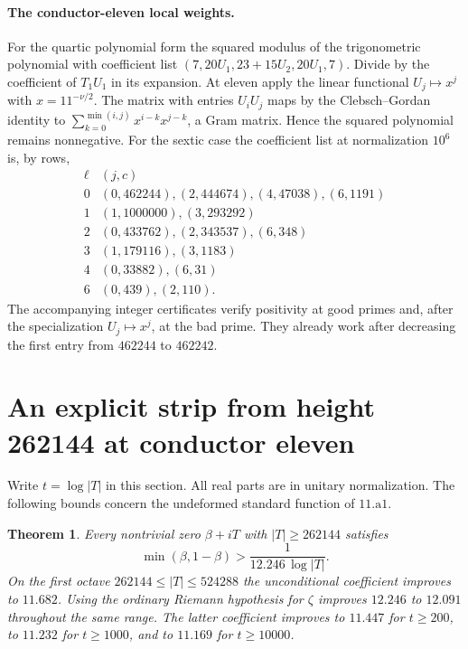 \documentclass[11pt]{article}
\newtheorem{theorem}{Theorem}[section]\newtheorem{lemma}[theorem]{Lemma}\newtheorem{corollary}[theorem]{Corollary}
\begin{document}
\paragraph{The conductor-eleven local weights.}
For the quartic polynomial form the squared modulus of the trigonometric polynomial with coefficient list $(7,20U_1,23+15U_2,20U_1,7)$. Divide by the coefficient of $T_1 U_1$ in its expansion. At eleven apply the linear functional $U_j\mapsto x^j$ with $x=11^{-\nu/2}$. The matrix with entries $U_i U_j$ maps by the Clebsch--Gordan identity to $\sum_{k=0}^{\min(i,j)} x^{i-k}x^{j-k}$, a Gram matrix. Hence the squared polynomial remains nonnegative. For the sextic case the coefficient list at normalization $10^6$ is, by rows,
\[
\begin{array}{c|l}
\ell&(j,c)\\ \hline
0&(0,462244),(2,444674),(4,47038),(6,1191)\\
1&(1,1000000),(3,293292)\\
2&(0,433762),(2,343537),(6,348)\\
3&(1,179116),(3,1183)\\
4&(0,33882),(6,31)\\
6&(0,439),(2,110).
\end{array}
\]
The accompanying integer certificates verify positivity at good primes and, after the specialization $U_j\mapsto x^j$, at the bad prime. They already work after decreasing the first entry from $462244$ to $462242$.


\section{An explicit strip from height 262144 at conductor eleven}
\label{section:level11-effective}
Write $t=\log|T|$ in this section. All real parts are in unitary normalization. The following bounds concern the undeformed standard function of $11.\mathrm{a1}$.

\begin{theorem}
Every nontrivial zero $\beta+iT$ with $|T|\ge262144$ satisfies
\[
       \min(\beta,1-\beta)>\frac1{12.246\,\log |T|}.
\]
On the first octave $262144\le |T|\le524288$ the unconditional coefficient improves to $11.682$. Using the ordinary Riemann hypothesis for $\zeta$ improves $12.246$ to $12.091$ throughout the same range. The latter coefficient improves to $11.447$ for $t\ge200$, to $11.232$ for $t\ge1000$, and to $11.169$ for $t\ge10000$.
\end{theorem}
\end{document}
